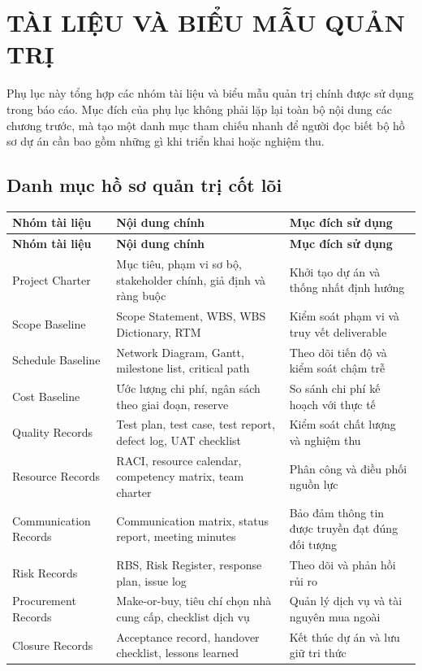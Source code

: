 \chapter{TÀI LIỆU VÀ BIỂU MẪU QUẢN TRỊ}

Phụ lục này tổng hợp các nhóm tài liệu và biểu mẫu quản trị chính được sử dụng trong báo cáo. Mục đích của phụ lục không phải lặp lại toàn bộ nội dung các chương trước, mà tạo một danh mục tham chiếu nhanh để người đọc biết bộ hồ sơ dự án cần bao gồm những gì khi triển khai hoặc nghiệm thu.

\iffalse
\section{Danh mục hồ sơ quản trị cốt lõi}

\begin{longtable}{p{4.2cm}p{4.8cm}p{5.2cm}}
\toprule
\textbf{Nhóm tài liệu} & \textbf{Nội dung chính} & \textbf{Mục đích sử dụng} \\
\midrule
\endfirsthead
\toprule
\textbf{Nhóm tài liệu} & \textbf{Nội dung chính} & \textbf{Mục đích sử dụng} \\
\midrule
\endhead
Project Charter & Mục tiêu, phạm vi sơ bộ, stakeholder chính, giả định và ràng buộc & Khởi tạo dự án và thống nhất định hướng \\
Scope Baseline & Scope Statement, WBS, WBS Dictionary, RTM & Kiểm soát phạm vi và truy vết deliverable \\
Schedule Baseline & Network Diagram, Gantt, milestone list, critical path & Theo dõi tiến độ và kiểm soát chậm trễ \\
Cost Baseline & Ước lượng chi phí, ngân sách theo giai đoạn, reserve & So sánh chi phí kế hoạch với thực tế \\
Quality Records & Test plan, test case, test report, defect log, UAT checklist & Kiểm soát chất lượng và nghiệm thu \\
Resource Records & RACI, resource calendar, competency matrix, team charter & Phân công và điều phối nguồn lực \\
Communication Records & Communication matrix, status report, meeting minutes & Bảo đảm thông tin được truyền đạt đúng đối tượng \\
Risk Records & RBS, Risk Register, response plan, issue log & Theo dõi và phản hồi rủi ro \\
Procurement Records & Make-or-buy, tiêu chí chọn nhà cung cấp, checklist dịch vụ & Quản lý dịch vụ và tài nguyên mua ngoài \\
Closure Records & Acceptance record, handover checklist, lessons learned & Kết thúc dự án và lưu giữ tri thức \\
\bottomrule
\end{longtable}

